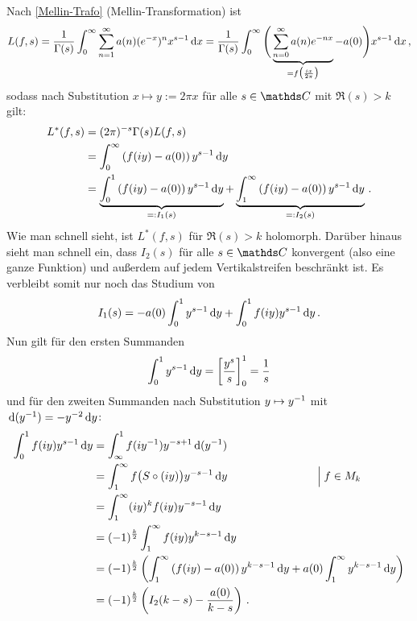\begin{bewe}
Nach \autoref{Mellin-Trafo} (Mellin-Transformation) ist
\[
	L(f,s) 
	= \frac 1{\Gamma(s)} \int_0^\infty \sum_{n=1}^\infty a(n) (e^{-x})^n x^{s-1} \,\mathrm{d} x
	= \frac 1{\Gamma(s)} \int_0^\infty \Bigg( \underbrace{\sum_{n=0}^\infty a(n) e^{-nx}}_{= f\bigl(\frac{ix}{2\pi}\bigr)} - a(0) \Bigg) x^{s-1} \,\mathrm{d} x
	\,,
\]
sodass nach Substitution $x \mapsto y := 2\pi x$ für alle $s \in \CC$ mit $\Re(s) > k$ gilt:
\begin{align*}
	L^*(f,s) 
	&= (2\pi)^{-s} \Gamma(s) L(f,s) \\
	&= \int_0^\infty \left( f(iy) - a(0) \right) y^{s-1} \,\mathrm{d} y \\
	&= \underbrace{\int_0^1 \left( f(iy) - a(0) \right) y^{s-1} \,\mathrm{d} y}_{=: I_1(s)} + \underbrace{\int_1^\infty \left( f(iy) - a(0) \right) y^{s-1} \,\mathrm{d} y}_{=: I_2(s)}
	\,.
\end{align*}
Wie man schnell sieht, ist $L^*(f,s)$ für $\Re(s) > k$ holomorph. Darüber hinaus sieht man schnell ein, dass $I_2(s)$ für alle $s \in \CC$ konvergent (also eine ganze Funktion) und außerdem auf jedem Vertikalstreifen beschränkt ist. Es verbleibt somit nur noch das Studium von
\[
	I_1(s) = - a(0) \int_0^1 y^{s-1} \,\mathrm{d} y + \int_0^1 f(iy) y^{s-1} \,\mathrm{d} y
	\,.
\]
Nun gilt für den ersten Summanden
\[
	\int_0^1 y^{s-1} \,\mathrm{d} y = \left[ \frac {y^s}s \right]_0^1 = \frac 1s
\]
und für den zweiten Summanden nach Substitution $y \mapsto y^{-1}$ mit $\,\mathrm{d} (y^{-1}) = -y^{-2} \,\mathrm{d} y$:
\begin{align*}
	\int_0^1 f(iy) y^{s-1} \,\mathrm{d} y
	&= \int_\infty^1 f(i y^{-1}) y^{-s+1} \,\mathrm{d} (y^{-1}) \\
	&= \int_1^\infty f \big( S \circ (iy) \big) y^{-s-1} \,\mathrm{d} y \qquad \qquad \qquad \qquad \Big| \; f \in M_k \\
	&= \int_1^\infty (iy)^k f(iy) y^{-s-1} \,\mathrm{d} y \\
	&= (-1)^{\frac k2} \int_1^\infty f(iy) y^{k-s-1} \,\mathrm{d} y \\
	&= (-1)^{\frac k2} \left( \int_1^\infty \left( f(iy) - a(0) \right) y^{k-s-1} \,\mathrm{d} y + a(0) \int_1^\infty y^{k-s-1} \,\mathrm{d} y \right) \\
	&= (-1)^{\frac k2} \left( I_2(k-s) - \frac {a(0)}{k-s} \right)
	\,.
\end{align*}


\end{bewe}
